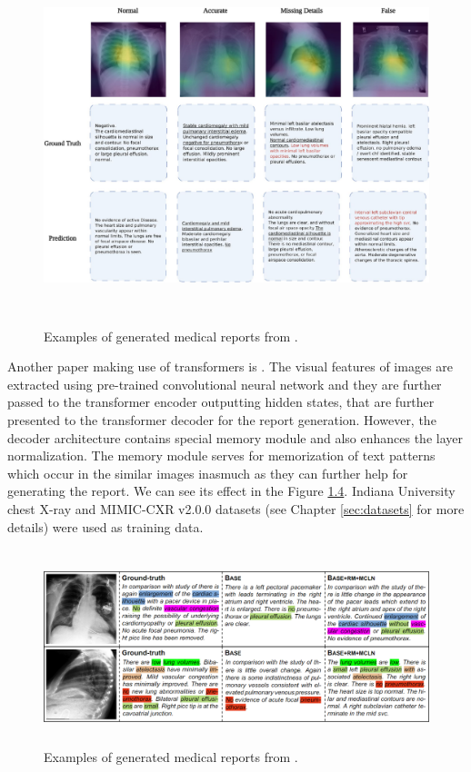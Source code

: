 \begin{figure}[h]\centering
\includegraphics[width=145mm, height=104mm]{../img/OmarExample}
\caption{Examples of generated medical reports from \citet{alfarghaly2021automated}.}
\label{fig03:OmarExample}
\end{figure}

Another paper making use of transformers is \citet{chen2020generating}. The visual features of images are extracted using pre-trained convolutional neural network and they are further passed to the transformer encoder outputting hidden states, that are further presented to the transformer decoder for the report generation. However, the decoder architecture contains special memory module and also enhances the layer normalization. The memory module serves for memorization of text patterns which occur in the similar images inasmuch as they can further help for generating the report. We can see its effect in the Figure \hyperref[fig04:ZhihongExample]{1.4}. Indiana University chest X-ray and MIMIC-CXR v2.0.0 datasets (see Chapter \ref{sec:datasets} for more details) were used as training data.\\

\begin{figure}[h]\centering
\includegraphics[width=145mm, height=57mm]{../img/ZhihongExample}
\caption{Examples of generated medical reports from \citet{chen2020generating}.}
\label{fig04:ZhihongExample}
\end{figure}

